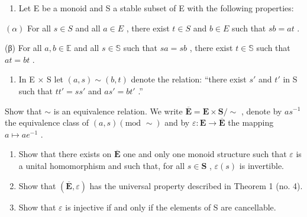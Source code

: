 \begin{enumerate}
\def\labelenumi{\arabic{enumi}.}
\setcounter{enumi}{16}
\tightlist
\item
  Let E be a monoid and S a stable subset of E with the following properties:
\end{enumerate}

\((\alpha)\) For all \(s \in S\) and all \(a \in E\) , there exist \(t \in S\) and \(b \in E\) such that \(sb = at\) .

(β) For all \(a, b \in \mathbb{E}\) and all \(s \in \mathbb{S}\) such that \(sa = sb\) , there exist \(t \in \mathbb{S}\) such that \(at = bt\) .

\begin{enumerate}
\def\labelenumi{(\alph{enumi})}
\tightlist
\item
  In E × S let \((a, s) \sim (b, t)\) denote the relation: ``there exist \(s'\) and \(t'\) in S such that \(tt' = ss'\) and \(as' = bt'\) .''
\end{enumerate}

Show that \(\sim\) is an equivalence relation. We write \(\overline{\mathbf{E}} = \mathbf{E} \times \mathbf{S}/\sim\) , denote by \(as^{-1}\) the equivalence class of \((a, s) (\text{mod } \sim)\) and by \(\varepsilon: \mathbf{E} \to \overline{\mathbf{E}}\) the mapping \(a \mapsto ae^{-1}\) .

\begin{enumerate}
\def\labelenumi{(\alph{enumi})}
\setcounter{enumi}{1}
\item
  Show that there exists on \(\overline{\mathbf{E}}\) one and only one monoid structure such that \(\varepsilon\) is a unital homomorphism and such that, for all \(s \in \mathbf{S}\) , \(\varepsilon(s)\) is invertible.
\item
  Show that \((\overline{\mathbf{E}},\varepsilon)\) has the universal property described in Theorem 1 (no. 4).
\item
  Show that \(\varepsilon\) is injective if and only if the elements of S are cancellable.
\end{enumerate}

